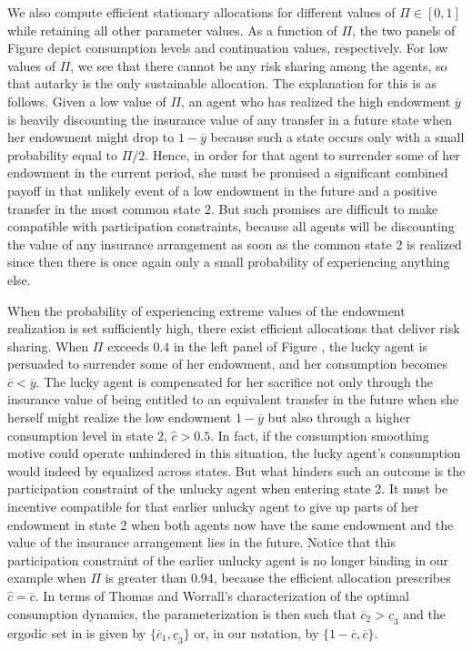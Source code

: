 We also compute efficient stationary allocations for different
values of $\Pi\in[0,1]$ while retaining all other parameter
values. As a function of $\Pi$, the two panels of Figure 
  depict consumption levels and continuation values,
respectively. For low values of $\Pi$, we see that there cannot be
any risk sharing among the agents, so that autarky is the only
sustainable allocation. The explanation for this is as follows.
Given a low value of $\Pi$, an agent who has realized the high
endowment $\overline y$ is heavily discounting the insurance value
of any transfer in a future state when her endowment might drop to
$1-\overline y$ because such a state occurs only with a small
probability equal to $\Pi/2$. Hence, in order for that agent to
surrender some of her endowment in the current period, she must be
promised a significant combined payoff in that unlikely event of a
low endowment in the future and a positive transfer in the most
common state 2. But such promises are difficult to make compatible
with participation constraints, because all agents will be
discounting the value of any insurance arrangement as soon as the
common state 2 is realized since then there is once again only a
small probability of experiencing anything else.

When the probability of experiencing extreme values of the
endowment realization is set sufficiently high, there exist
efficient allocations that deliver risk sharing. When $\Pi$
exceeds $0.4$ in
the left panel of Figure %
, the lucky agent is persuaded to surrender some
of her endowment, and her consumption becomes $\overline c < \overline y$.
The lucky agent is compensated for her sacrifice not only
through the insurance value of being entitled to an equivalent transfer
in the future when she herself might realize the low endowment
$1-\overline y$ but also through a higher consumption level in
state 2, $\hat c > 0.5$.
 In fact, if the consumption smoothing motive
could operate unhindered in this situation, the lucky agent's
consumption would indeed by equalized across states. But what hinders
such an outcome is the participation constraint of the unlucky agent
when entering state 2. It must be incentive compatible for that
earlier unlucky agent to give up parts of her endowment in state 2
when both agents now have the same endowment and the value of the insurance
arrangement lies in the future. Notice that this participation constraint of
the earlier unlucky agent is no longer binding in our example when
$\Pi$ is greater than $0.94$, because the efficient allocation prescribes
$\hat c = \overline c$.
In terms of Thomas and Worrall's characterization of the optimal
consumption dynamics, the parameterization is then such that
$\overline c_2 > \underline c_3$ and the ergodic set in
 is given by $\{\overline c_1, \underline c_3\}$
or, in our notation, by $\{1-\overline c, \overline c\}$.



